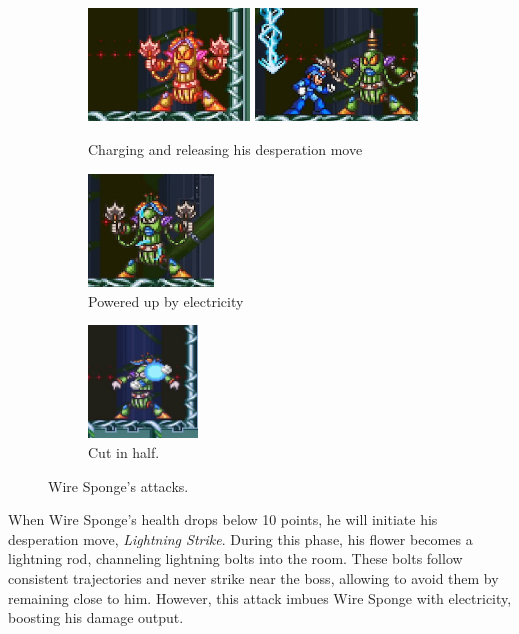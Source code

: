 \begin{figure}[htp]
	\ContinuedFloat
	\centering
	\begin{subfigure}{\linewidth}
		\centering
		\includegraphics[height=3cm]{figures/X2/Wire_sponge/Sponge_phase2.jpg}
		\includegraphics[height=3cm]{figures/X2/Wire_sponge/Sponge_DM.jpg}
		\caption{Charging and releasing his desperation move}
	\end{subfigure}
	\begin{subfigure}{0.35\linewidth}
		\centering
		\includegraphics[height=3cm]{figures/X2/Wire_sponge/Sponge_charged.jpg}
		\caption{Powered up by electricity}
	\end{subfigure}
	\begin{subfigure}{0.35\linewidth}
		\centering
		\includegraphics[height=3cm]{figures/X2/Wire_sponge/Sponge_cut.jpg}
		\caption{Cut in half.}
	\end{subfigure}
	\caption{Wire Sponge's attacks.}
\end{figure}
When Wire Sponge's health drops below 10 points, he will initiate his desperation move, \emph{Lightning Strike}. During this phase, his flower becomes a lightning rod, channeling lightning bolts into the room. These bolts follow consistent trajectories and never strike near the boss, allowing to avoid them by remaining close to him. However, this attack imbues Wire Sponge with electricity, boosting his damage output.

